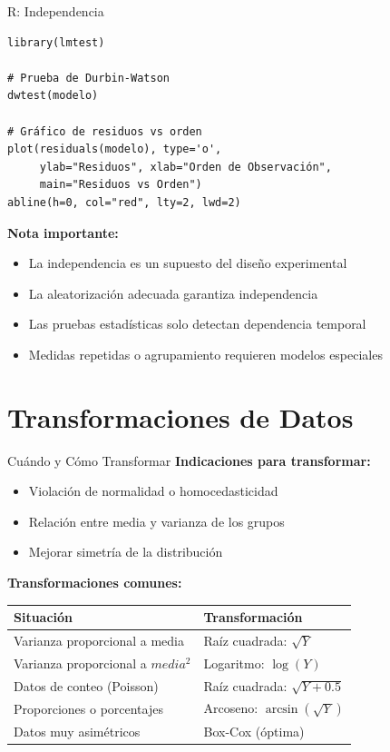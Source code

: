 \documentclass[aspectratio=169]{beamer}
\begin{document}
\begin{frame}[fragile]{R: Independencia}
\small
\begin{verbatim}
library(lmtest)

# Prueba de Durbin-Watson
dwtest(modelo)

# Gráfico de residuos vs orden
plot(residuals(modelo), type='o',
     ylab="Residuos", xlab="Orden de Observación",
     main="Residuos vs Orden")
abline(h=0, col="red", lty=2, lwd=2)
\end{verbatim}

\vspace{0.3cm}
\textbf{Nota importante:}
\begin{itemize}
\item La independencia es un supuesto del diseño experimental
\item La aleatorización adecuada garantiza independencia
\item Las pruebas estadísticas solo detectan dependencia temporal
\item Medidas repetidas o agrupamiento requieren modelos especiales
\end{itemize}
\end{frame}

\section{Transformaciones de Datos}

\begin{frame}{Cuándo y Cómo Transformar}
\textbf{Indicaciones para transformar:}
\begin{itemize}
\item Violación de normalidad o homocedasticidad
\item Relación entre media y varianza de los grupos
\item Mejorar simetría de la distribución
\end{itemize}

\vspace{0.3cm}

\textbf{Transformaciones comunes:}
\begin{table}
\small
\begin{tabular}{ll}
\toprule
\textbf{Situación} & \textbf{Transformación} \\
\midrule
Varianza proporcional a media & Raíz cuadrada: $\sqrt{Y}$ \\
Varianza proporcional a $media^2$ & Logaritmo: $\log(Y)$ \\
Datos de conteo (Poisson) & Raíz cuadrada: $\sqrt{Y + 0.5}$ \\
Proporciones o porcentajes & Arcoseno: $\arcsin(\sqrt{Y})$ \\
Datos muy asimétricos & Box-Cox (óptima) \\
\bottomrule
\end{tabular}
\end{table}
\end{frame}
\end{document}
